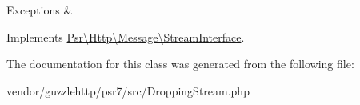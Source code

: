 \begin{DoxyExceptions}{Exceptions}
{\em } & \\
\hline
\end{DoxyExceptions}


Implements \hyperlink{interfacePsr_1_1Http_1_1Message_1_1StreamInterface_aabf9fe3e09f85753834cdb69bbdf3c3d}{Psr\textbackslash{}\+Http\textbackslash{}\+Message\textbackslash{}\+Stream\+Interface}.



The documentation for this class was generated from the following file\+:\begin{DoxyCompactItemize}
\item 
vendor/guzzlehttp/psr7/src/Dropping\+Stream.\+php\end{DoxyCompactItemize}

